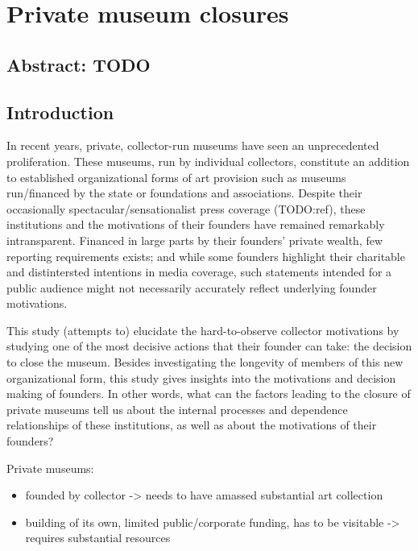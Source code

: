 \documentclass[11pt]{article}
\author{Johannes }
\date{\today}
\title{}
\begin{document}
\section*{Private museum closures}


\subsection*{Abstract: TODO}


\subsection*{Introduction}


In recent years, private, collector-run museums have seen an unprecedented proliferation.
These museums, run by individual collectors, constitute an addition to established organizational forms of art provision such as museums run/financed by the state or foundations and associations.
Despite their occasionally spectacular/sensationalist press coverage (TODO:ref), these institutions and the motivations of their founders have remained remarkably intransparent.
Financed in large parts by their founders' private wealth, few reporting requirements exists; and while some founders highlight their charitable and distintersted intentions in media coverage, such statements intended for a public audience might not necessarily accurately reflect underlying founder motivations.



This study (attempts to) elucidate the hard-to-observe collector motivations by studying one of the most decisive actions that their founder can take: the decision to close the museum.
Besides investigating the longevity of members of this new organizational form, this study gives insights into the motivations and decision making of founders.
In other words, what can the factors leading to the closure of private museums tell us about the internal processes and dependence relationships of these institutions, as well as about the motivations of their founders?





\bigbreak
\noindent
Private museums:
\begin{itemize}
\item founded by collector -> needs to have amassed substantial art collection
\item building of its own, limited public/corporate funding, has to be visitable -> requires substantial resources
\end{itemize}
\end{document}
